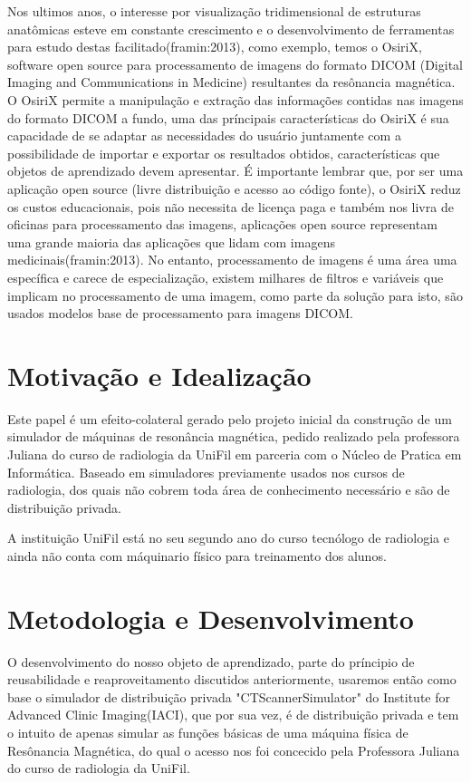 \documentclass[12pt,openright,oneside,a4paper,english,french,spanish,brazil]{unifil}
\begin{document}
Nos ultimos anos, o interesse por visualização tridimensional de estruturas anatômicas esteve em constante crescimento e o desenvolvimento de ferramentas para estudo destas facilitado(framin:2013), como exemplo, temos o OsiriX, software open source para processamento de imagens do formato DICOM (Digital Imaging and Communications in Medicine) resultantes da resônancia magnética. O OsiriX permite a manipulação e extração das informações contidas nas imagens do formato DICOM a fundo, uma das príncipais características do OsiriX é sua capacidade de se adaptar as necessidades do usuário juntamente com a possibilidade de importar e exportar os resultados obtidos, características que objetos de aprendizado devem apresentar. É importante lembrar que, por ser uma aplicação open source (livre distribuição e acesso ao código fonte), o OsiriX reduz os custos educacionais, pois não necessita de licença paga e também nos livra de oficinas para processamento das imagens, aplicações open source representam uma grande maioria das aplicações que lidam com imagens medicinais(framin:2013). No entanto, processamento de imagens é uma área uma específica e carece de especialização, existem milhares de filtros e variáveis que implicam no processamento de uma imagem, como parte da solução para isto, são usados modelos base de processamento para imagens DICOM.

\chapter{Motivação e Idealização}%

Este papel é um efeito-colateral gerado pelo projeto inicial da construção de um simulador de máquinas de resonância magnética, pedido realizado pela professora Juliana do curso de radiologia da UniFil em parceria com o Núcleo de Pratica em Informática. Baseado em simuladores previamente usados nos cursos de radiologia, dos quais não cobrem toda área de conhecimento necessário e são de distribuição privada.

A instituição UniFil está no seu segundo ano do curso tecnólogo de radiologia e ainda não conta com máquinario físico para treinamento dos alunos.

\chapter {Metodologia e Desenvolvimento}
O desenvolvimento do nosso objeto de aprendizado, parte do príncipio de reusabilidade e reaproveitamento discutidos anteriormente, usaremos então como base o simulador de distribuição privada "CTScannerSimulator" do Institute for Advanced Clinic Imaging(IACI), que por sua vez, é de distribuição privada e tem o intuito de apenas simular as funções básicas de uma máquina física de Resônancia Magnética, do qual o acesso nos foi concecido pela Professora Juliana do curso de radiologia da UniFil.
\end{document}
